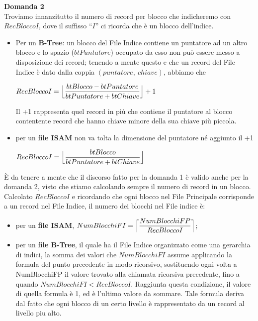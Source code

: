   \noindent\textbf{\fontsize{14pt}{1em}Domanda 2}\\
  Troviamo innanzitutto il numero di record per blocco che indicheremo con $RecBloccoI$, dove il suffisso ``$I$''
  ci ricorda che è un blocco dell'indice. 
  \begin{itemize}
   \item Per un \textbf{B-Tree}: un blocco del File Indice contiene un puntatore ad un altro blocco
  e lo spazio ($btPuntatore$) occupato da esso non può essere messo a disposizione dei record; tenendo a mente questo e che un record
  del File Indice è dato dalla coppia $(puntatore,\ chiave)$, abbiamo che
  \begin{center}
   $RecBloccoI = \Bigl\lfloor \dfrac{btBlocco - btPuntatore}{btPuntatore + btChiave}\Bigr\rfloor + 1$
  \end{center}
  Il +1 rappresenta quel record in più che contiene il puntatore al blocco contentente record che hanno chiave
  minore della sua chiave più piccola.
  \item per un \textbf{file ISAM} non va tolta la dimensione del puntatore né aggiunto il +1
  \begin{center}
   $RecBloccoI = \Bigl\lfloor \dfrac{btBlocco}{btPuntatore + btChiave}\Bigr\rfloor$
  \end{center}
  \end{itemize}
\`E da tenere a mente 
  che il discorso fatto per la domanda 1 è valido anche per la domanda 2, visto che stiamo calcolando
  sempre il numero di record in un blocco.\\
  Calcolato $RecBloccoI$ e ricordando che ogni blocco nel File Principale corrisponde a un record nel File Indice, il numero 
  dei blocchi nel File indice è:
  \begin{itemize}
   \item per un \textbf{file ISAM}, $NumBlocchiFI = \Bigl\lceil \dfrac{NumBlocchiFP}{RecBloccoI}\Bigr\rceil$;
   \item per un \textbf{file B-Tree}, il quale ha il File Indice organizzato come una gerarchia di indici,
   la somma dei valori che $NumBlocchiFI$ assume applicando la formula del punto precedente
   in modo ricorsivo, sostituendo ogni volta a NumBlocchiFP il valore trovato alla chiamata ricorsiva precedente, fino a quando
   $NumBlocchiFI < RecBloccoI$. Raggiunta questa condizione, il valore di quella formula è 1, ed è l'ultimo valore da sommare.
   Tale formula deriva dal fatto che ogni blocco di un certo livello è rappresentato da un record al livello piu alto.
  \end{itemize}
  
